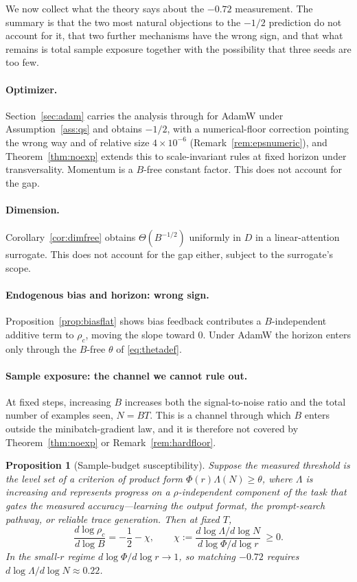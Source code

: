 \documentclass{article}
\theoremstyle{plain}
\newtheorem{proposition}{Proposition}
\theoremstyle{definition}
\theoremstyle{remark}
\newcommand{\1}{\mathbf{1}}
\begin{document}
We now collect what the theory says about the $-0.72$ measurement. The summary is
that the two most natural objections to the $-1/2$ prediction do not account for
it, that two further mechanisms have the wrong sign, and that what remains is
total sample exposure together with the possibility that three seeds are too few.

\paragraph{Optimizer.}
Section~\ref{sec:adam} carries the analysis through for AdamW under
Assumption~\ref{ass:qs} and obtains $-1/2$, with a numerical-floor correction
pointing the wrong way and of relative size $4\times10^{-6}$
(Remark~\ref{rem:epsnumeric}), and
Theorem~\ref{thm:noexp} extends this to scale-invariant rules at fixed horizon
under transversality. Momentum is a $B$-free constant factor. This does not
account for the gap.

\paragraph{Dimension.}
Corollary~\ref{cor:dimfree} obtains $\Theta(B^{-1/2})$ uniformly in $D$ in a
linear-attention surrogate. This does not account for the gap either, subject to
the surrogate's scope.

\paragraph{Endogenous bias and horizon: wrong sign.}
Proposition~\ref{prop:biasflat} shows bias feedback contributes a
$B$-independent additive term to $\rho_c$, moving the slope toward $0$. Under
AdamW the horizon enters only through the $B$-free $\theta$ of
\eqref{eq:thetadef}.

\paragraph{Sample exposure: the channel we cannot rule out.}
At fixed steps, increasing $B$ increases both the signal-to-noise ratio and the
total number of examples seen, $N = BT$. This is a channel through which $B$
enters outside the minibatch-gradient law, and it is therefore not covered by
Theorem~\ref{thm:noexp} or Remark~\ref{rem:hardfloor}.

\begin{proposition}[Sample-budget susceptibility]
\label{prop:susceptibility}
Suppose the measured threshold is the level set of a criterion of product form
$\Phi(r)\Lambda(N)\ge\theta$, where $\Lambda$ is increasing and represents
progress on a $\rho$-independent component of the task that gates the measured
accuracy---learning the output format, the prompt-search pathway, or reliable
trace generation. Then at fixed $T$,
\begin{equation}
\label{eq:susceptibility}
\frac{d\log\rho_c}{d\log B} = -\frac12 - \chi,
\qquad
\chi := \frac{d\log\Lambda/d\log N}{d\log\Phi/d\log r}\ \ge 0 .
\end{equation}
In the small-$r$ regime $d\log\Phi/d\log r\to1$, so matching $-0.72$ requires
$d\log\Lambda/d\log N\approx0.22$.
\end{proposition}
\end{document}
